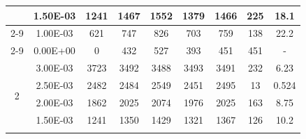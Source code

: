 \begin{table}[H]
{\begin{tabular}{|c|c|c|c|c|c|c|c|c|}
                               & 1.50E-03         & 1241      & 1467                                                       & 1552                                                      & 1379                                                      & 1466    & 225    & 18.1                                                               \\ \cline{2-9}
                               & 1.00E-03         & 621       & 747                                                        & 826                                                       & 703                                                       & 759     & 138    & 22.2                                                               \\ \cline{2-9}
                               & 0.00E+00         & 0         & 432                                                        & 527                                                       & 393                                                       & 451     & 451    & -                                                                  \\ \hline
            \multirow{6}{*}{2} & 3.00E-03         & 3723      & 3492                                                       & 3488                                                      & 3493                                                      & 3491    & 232    & 6.23                                                               \\ \cline{2-9}
                               & 2.50E-03         & 2482      & 2484                                                       & 2549                                                      & 2451                                                      & 2495    & 13     & 0.524                                                              \\ \cline{2-9}
                               & 2.00E-03         & 1862      & 2025                                                       & 2074                                                      & 1976                                                      & 2025    & 163    & 8.75                                                               \\ \cline{2-9}
                               & 1.50E-03         & 1241      & 1350                                                       & 1429                                                      & 1321                                                      & 1367    & 126    & 10.2                                                               \\ \cline{2-9}

\end{tabular}}
\end{table}
